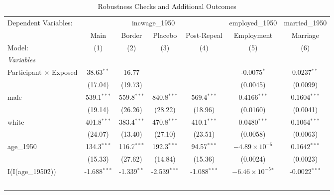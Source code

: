 
\begin{table}[htbp]
   \caption{\label{tab:robust} Robustness Checks and Additional Outcomes}
   \centering
   \begin{adjustbox}{max width=\textwidth}
   \begin{tabular}{lcccccc}
      \tabularnewline \midrule \midrule
      Dependent Variables: & \multicolumn{4}{c}{incwage\_1950} & employed\_1950 & married\_1950\\
                                    & Main           & Border        & Placebo        & Post-Repeal    & Employment                   & Marriage \\   
      Model:                        & (1)            & (2)           & (3)            & (4)            & (5)                          & (6)\\  
      \midrule
      \emph{Variables}\\
      Participant $\times$ Exposed  & 38.63$^{**}$   & 16.77         &                &                & -0.0075$^{*}$                & 0.0237$^{**}$\\   
                                    & (17.04)        & (19.73)       &                &                & (0.0045)                     & (0.0099)\\   
      male                          & 539.1$^{***}$  & 559.8$^{***}$ & 840.8$^{***}$  & 569.4$^{***}$  & 0.4166$^{***}$               & 0.1604$^{***}$\\   
                                    & (19.14)        & (26.26)       & (28.22)        & (18.96)        & (0.0160)                     & (0.0041)\\   
      white                         & 401.8$^{***}$  & 383.4$^{***}$ & 470.8$^{***}$  & 410.1$^{***}$  & 0.0480$^{***}$               & 0.1064$^{***}$\\   
                                    & (24.07)        & (13.40)       & (27.10)        & (23.51)        & (0.0058)                     & (0.0063)\\   
      age\_1950                     & 134.3$^{***}$  & 116.7$^{***}$ & 192.3$^{***}$  & 94.57$^{***}$  & $-4.89\times 10^{-5}$        & 0.1642$^{***}$\\   
                                    & (15.33)        & (27.62)       & (14.84)        & (15.36)        & (0.0024)                     & (0.0023)\\   
      I(I(age\_1950\^2))            & -1.688$^{***}$ & -1.339$^{**}$ & -2.539$^{***}$ & -1.088$^{***}$ & $-6.46\times 10^{-5}$$^{*}$  & -0.0022$^{***}$\\   
$$
\end{tabular}
\end{adjustbox}
\end{table}
